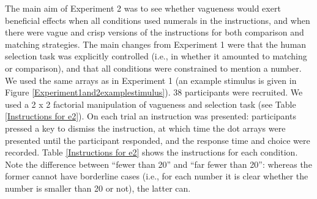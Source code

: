 
The main aim of Experiment 2 was to see whether vagueness would exert beneficial effects when all conditions used numerals in the instructions, and when there were vague and crisp versions of the instructions for both comparison and matching strategies. The main changes from Experiment 1 were that the human selection task was explicitly controlled (i.e., in whether it amounted to matching or comparison), and that all conditions were constrained to mention a number. We used the same arrays as in Experiment 1 (an example stimulus is given in Figure \ref{Experiment1and2examplestimulus}). 38 participants were recruited. We used a 2 x 2 factorial manipulation of vagueness and selection task (see Table \ref{Instructions for e2}). On each trial an instruction was presented: participants pressed a key to dismiss the instruction, at which time the dot arrays were presented until the participant responded, and the response time and choice were recorded. Table \ref{Instructions for e2} shows the instructions for each condition. Note the difference between ``fewer than 20'' and ``far fewer than 20'': whereas the former cannot have borderline cases (i.e., for each number it is clear whether the number is smaller than 20 or not), the latter can.

